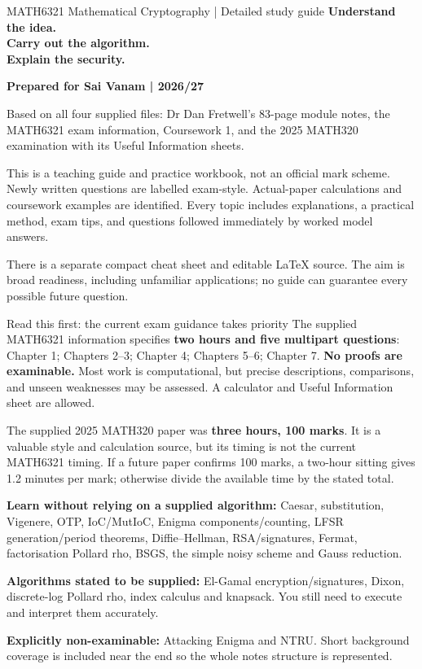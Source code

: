 \documentclass[11pt,a4paper]{article}
\begin{document}
\begin{concept}{MATH6321 Mathematical Cryptography | Detailed study guide}
\Huge\textbf{Understand the idea.\\Carry out the algorithm.\\Explain the security.}\normalsize

\textbf{Prepared for Sai Vanam | 2026/27}

Based on all four supplied files: Dr Dan Fretwell's 83-page module notes, the MATH6321 exam information, Coursework 1, and the 2025 MATH320 examination with its Useful Information sheets.

This is a teaching guide and practice workbook, not an official mark scheme. Newly written questions are labelled exam-style. Actual-paper calculations and coursework examples are identified. Every topic includes explanations, a practical method, exam tips, and questions followed immediately by worked model answers.

There is a separate compact cheat sheet and editable LaTeX source. The aim is broad readiness, including unfamiliar applications; no guide can guarantee every possible future question.
\end{concept}
\begin{concept}{Read this first: the current exam guidance takes priority}
The supplied MATH6321 information specifies \textbf{two hours and five multipart questions}: Chapter 1; Chapters 2--3; Chapter 4; Chapters 5--6; Chapter 7. \textbf{No proofs are examinable.} Most work is computational, but precise descriptions, comparisons, and unseen weaknesses may be assessed. A calculator and Useful Information sheet are allowed.

The supplied 2025 MATH320 paper was \textbf{three hours, 100 marks}. It is a valuable style and calculation source, but its timing is not the current MATH6321 timing. If a future paper confirms 100 marks, a two-hour sitting gives 1.2 minutes per mark; otherwise divide the available time by the stated total.

\textbf{Learn without relying on a supplied algorithm:} Caesar, substitution, Vigenere, OTP, IoC/MutIoC, Enigma components/counting, LFSR generation/period theorems, Diffie--Hellman, RSA/signatures, Fermat, factorisation Pollard rho, BSGS, the simple noisy scheme and Gauss reduction.

\textbf{Algorithms stated to be supplied:} El-Gamal encryption/signatures, Dixon, discrete-log Pollard rho, index calculus and knapsack. You still need to execute and interpret them accurately.

\textbf{Explicitly non-examinable:} Attacking Enigma and NTRU. Short background coverage is included near the end so the whole notes structure is represented.
\end{concept}
\end{document}
